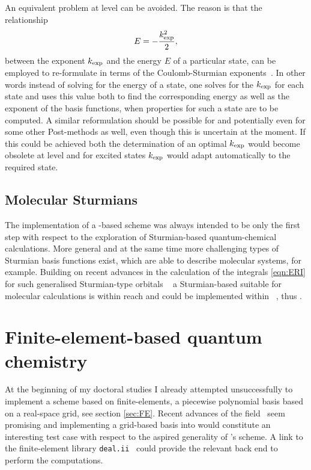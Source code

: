 \noindent
An equivalent problem at \FCI level can be avoided.
The reason is that the relationship
\[ E = - \frac{k_\text{exp}^2}{2}, \]
between the \CS exponent $k_\text{exp}$ and the energy $E$ of a particular state,
can be employed to re-formulate \FCI in terms of the
Coulomb-Sturmian exponents~\cite{Avery2006}.
In other words instead of solving for the energy of a state,
one solves for the $k_\text{exp}$ for each state
and uses this value both to find the corresponding energy
as well as the exponent of the basis functions,
when properties for such a state are to be computed.
A similar reformulation should be possible for \HF
and potentially even for some other Post-\HF methods as well,
even though this is uncertain at the moment.
If this could be achieved both the determination of an optimal
$k_\text{exp}$ would become obsolete at \HF level
and for excited states $k_\text{exp}$ would adapt automatically to the required state.

\subsection{Molecular Sturmians}
The implementation of a \CS-based \SCF scheme was always intended
to be only the first step with respect to the exploration
of Sturmian-based quantum-chemical calculations.
More general and at the same time more challenging types of Sturmian basis
functions exist,
which are able to describe molecular systems, for example.
Building on recent advances in the calculation of the \ERI integrals
\eqref{eqn:ERI} for such generalised Sturmian-type orbitals%
~\cite{Avery2006,Avery2011PhD,Avery2011,Morales2016,Avery2017,Randazzo2015,Granados2016}
a Sturmian-based \HF suitable for molecular calculations is within reach
and could be implemented within \sturmint~\cite{sturmintWeb}, thus \molsturm.

\section{Finite-element-based quantum chemistry}
At the beginning of my doctoral studies I already attempted
unsuccessfully to implement a \HF scheme based on finite-elements,
a piecewise polynomial basis based on a real-space grid,
see section \vref{sec:FE}.
Recent advances of the field~\cite{Frediani2015,Toivanen2015,Davydov2015,Boffi2016}
seem promising and
implementing a grid-based basis into \molsturm
would constitute an interesting test case with respect to the aspired generality
of \molsturm's \SCF scheme.
A link to the finite-element library \texttt{deal.ii}~\cite{Arndt2017}
could provide the relevant back end to perform the computations.

